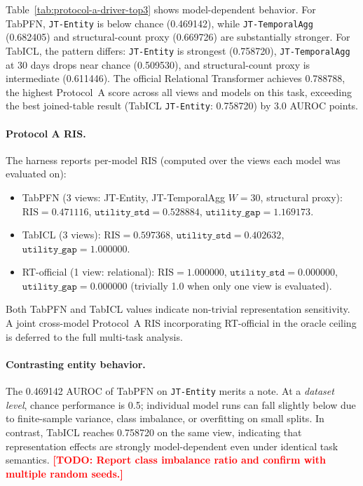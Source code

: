 \documentclass[11pt]{article}
\newcommand{\todo}[1]{\textcolor{red}{\textbf{[TODO: #1]}}}
\newcommand{\RIS}{\mathrm{RIS}}
\newcommand{\viewname}[1]{\texttt{#1}}
\begin{document}
Table~\ref{tab:protocol-a-driver-top3} shows model-dependent behavior.
For TabPFN, \viewname{JT-Entity} is below chance (0.469142), while
\viewname{JT-TemporalAgg} (0.682405) and structural-count proxy
(0.669726) are substantially stronger.
For TabICL, the pattern differs: \viewname{JT-Entity} is strongest
(0.758720), \viewname{JT-TemporalAgg} at 30 days drops near chance
(0.509530), and structural-count proxy is intermediate (0.611446).
The official Relational Transformer achieves 0.788788, the highest
Protocol~A score across all views and models on this task, exceeding
the best joined-table result (TabICL \viewname{JT-Entity}: 0.758720)
by 3.0 AUROC points.

\paragraph{Protocol A RIS.}
The harness reports per-model RIS (computed over the views each model was evaluated on):
\begin{itemize}
  \item TabPFN (3 views: JT-Entity, JT-TemporalAgg $W=30$, structural proxy):
        \(\RIS = 0.471116\),
        \(\texttt{utility\_std} = 0.528884\),
        \(\texttt{utility\_gap} = 1.169173\).
  \item TabICL (3 views): \(\RIS = 0.597368\),
        \(\texttt{utility\_std} = 0.402632\),
        \(\texttt{utility\_gap} = 1.000000\).
  \item RT-official (1 view: relational): \(\RIS = 1.000000\),
        \(\texttt{utility\_std} = 0.000000\),
        \(\texttt{utility\_gap} = 0.000000\)
        (trivially 1.0 when only one view is evaluated).
\end{itemize}
Both TabPFN and TabICL values indicate non-trivial representation sensitivity.
A joint cross-model Protocol~A RIS incorporating RT-official in the oracle
ceiling is deferred to the full multi-task analysis.

\paragraph{Contrasting entity behavior.}
The 0.469142 AUROC of TabPFN on \viewname{JT-Entity} merits a note.
At a \emph{dataset level}, chance performance is 0.5; individual
model runs can fall slightly below due to finite-sample variance,
class imbalance, or overfitting on small splits.
In contrast, TabICL reaches 0.758720 on the same view, indicating that
representation effects are strongly model-dependent even under identical
task semantics.
\todo{Report class imbalance ratio and confirm with multiple random
seeds.}
\end{document}
